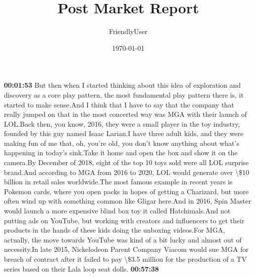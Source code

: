 \documentclass{article}%
\title{Post Market Report}%
\author{FriendlyUser}%
\date{\today}%
\begin{document}
%
\normalsize%
\textbf{00:01:53}%
\newline%
But then when I started thinking about this idea of exploration and discovery as a core play pattern, the most fundamental play pattern there is, it started to make sense.And I think that I have to say that the company that really jumped on that in the most concerted way was MGA with their launch of LOL.Back then, you know, 2016, they were a small player in the toy industry, founded by this guy named Isaac Larian.I have three adult kids, and they were making fun of me that, oh, you're old, you don't know anything about what's happening in today's sink.Take it home and open the box and show it on the camera.By December of 2018, eight of the top 10 toys sold were all LOL surprise brand.And according to MGA from 2016 to 2020, LOL would generate over \textbackslash{}\$10 billion in retail sales worldwide.The most famous example in recent years is Pokemon cards, where you open packs in hopes of getting a Charizard, but more often wind up with something common like Gligar here.And in 2016, Spin Master would launch a more expensive blind box toy it called Hatchimals.And not putting ads on YouTube, but working with creators and influencers to get their products in the hands of these kids doing the unboxing videos.For MGA, actually, the move towards YouTube was kind of a bit lucky and almost out of necessity.In late 2015, Nickelodeon Parent Company Viacom would sue MGA for breach of contract after it failed to pay \textbackslash{}\$3.5 million for the production of a TV series based on their Lala loop seat dolls.%
\textbf{00:57:38}%
\newline%
\end{document}
